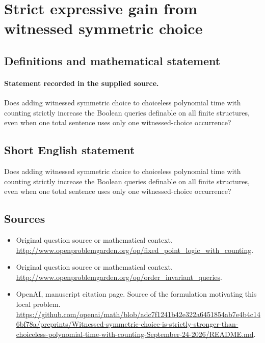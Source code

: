 \documentclass[11pt]{article}
\begin{document}
\section*{Strict expressive gain from witnessed symmetric choice}\label{30007206}
\subsection{Definitions and mathematical statement}
\paragraph{Statement recorded in the supplied source.}
Does adding witnessed symmetric choice to choiceless polynomial time with counting strictly increase the Boolean queries definable on all finite structures, even when one total sentence uses only one witnessed-choice occurrence?
\subsection{Short English statement}
Does adding witnessed symmetric choice to choiceless polynomial time with counting strictly increase the Boolean queries definable on all finite structures, even when one total sentence uses only one witnessed-choice occurrence?
\subsection{Sources}
\begin{itemize}
\item[S1] Original question source or mathematical context.
\url{http://www.openproblemgarden.org/op/fixed_point_logic_with_counting}.
\item[S2] Original question source or mathematical context.
\url{http://www.openproblemgarden.org/op/order_invariant_queries}.
\item[S3] OpenAI, manuscript citation page. Source of the formulation motivating this local problem.
\url{https://github.com/openai/math/blob/adc7f1241b42e322a6451854ab7e4b4c146bf78a/preprints/Witnessed-symmetric-choice-is-strictly-stronger-than-choiceless-polynomial-time-with-counting-September-24-2026/README.md}.
\end{itemize}
\end{document}
